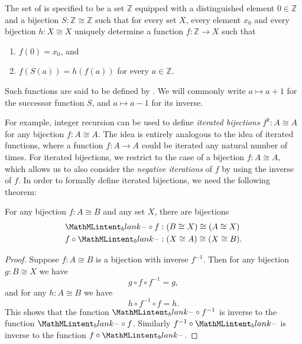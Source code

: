 \begin{definition}\label{definition:integers}
  The set of  is specified to be a set $\mathbb{Z}$ equipped with a distinguished  element $0\in \mathbb{Z}$ and a  bijection $S:\mathbb{Z}\cong\mathbb{Z}$ such that for every set $X$, every element $x_0$ and every bijection $h:X\cong X$ uniquely determine a function $f:\mathbb{Z}\to X$ such that
  \begin{enumerate}
  \item $f(0)=x_0$, and
  \item $f(S(a))=h(f(a))$ for every $a\in\mathbb{Z}$.
  \end{enumerate}
  Such functions are said to be defined by . We will commonly write $a\mapsto a+1$ for the successor function $S$, and $a\mapsto a-1$ for its inverse.
\end{definition}

For example, integer recursion can be used to define \emph{iterated bijections} $f^k:A\cong A$ for any bijection $f:A\cong A$. The idea is entirely analogous to the idea of iterated functions, where a function $f:A\to A$ could be iterated any natural number of times. For iterated bijections, we restrict to the case of a bijection $f:A\cong A$, which allows us to also consider the \emph{negative iterations} of $f$ by using the inverse of $f$. In order to formally define iterated bijections, we need the following theorem:

\begin{theorem}
  For any bijection $f: A\cong B$ and any set $X$, there are bijections
  \begin{align*}
    \blank\circ f & : (B\cong X)\cong (A\cong X) \\
    f\circ\blank & : (X\cong A)\cong (X\cong B).
  \end{align*}
\end{theorem}

\begin{proof}
  Suppose $f:A\cong B$ is a bijection with inverse $f^{-1}$. Then for any bijection $g:B\cong X$ we have
  \begin{equation*}
    g\circ f\circ f^{-1}=g,
  \end{equation*}
  and for any $h:A\cong B$ we have
  \begin{equation*}
    h\circ f^{-1}\circ f=h.
  \end{equation*}
  This shows that the function $\blank\circ f^{-1}$ is inverse to the function $\blank\circ f$. Similarly $f^{-1}\circ\blank$ is inverse to the function $f\circ\blank$.
\end{proof}

